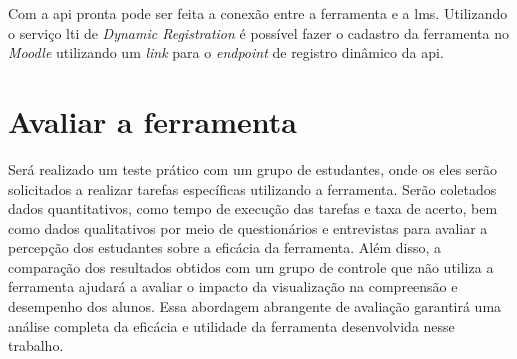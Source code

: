 \setlength{\abovecaptionskip}{10pt plus 0pt minus 0pt}
\setlength{\belowcaptionskip}{5pt plus 0pt minus 0pt}
\begin{table}[h]
  \centering\setlength{\extrarowheight}{2pt}
  \label{qua:endpoints}
  {}
\end{table}

Com a \gls{api} pronta pode ser feita a conexão entre a ferramenta e a \gls{lms}. Utilizando o serviço \gls{lti} de \textit{Dynamic Registration} é possível fazer o cadastro da ferramenta no \textit{Moodle} utilizando um \textit{link} para o \textit{endpoint} de registro dinâmico da \gls{api}.

\section{Avaliar a ferramenta}
Será realizado um teste prático com um grupo de estudantes, onde os eles serão solicitados a realizar tarefas específicas utilizando a ferramenta. Serão coletados dados quantitativos, como tempo de execução das tarefas e taxa de acerto, bem como dados qualitativos por meio de questionários e entrevistas para avaliar a percepção dos estudantes sobre a eficácia da ferramenta. Além disso, a comparação dos resultados obtidos com um grupo de controle que não utiliza a ferramenta ajudará a avaliar o impacto da visualização na compreensão e desempenho dos alunos. Essa abordagem abrangente de avaliação garantirá uma análise completa da eficácia e utilidade da ferramenta desenvolvida nesse trabalho.

